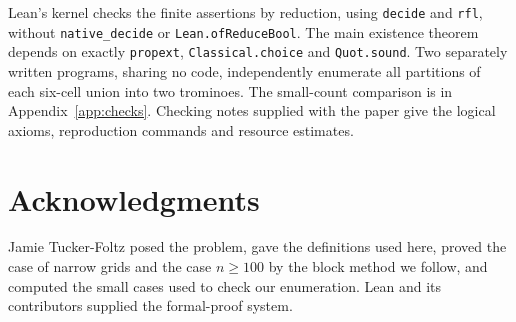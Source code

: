 \documentclass[11pt]{article}
\theoremstyle{definition}
\theoremstyle{remark}
\begin{document}
Lean's kernel checks the finite assertions by reduction, using
\texttt{decide} and \texttt{rfl}, without \texttt{native\_decide} or
\texttt{Lean.ofReduceBool}. The main existence theorem depends on exactly
\texttt{propext}, \texttt{Classical.choice} and \texttt{Quot.sound}. Two separately
written programs, sharing no code, independently enumerate all partitions
of each six-cell union into two trominoes. The small-count comparison is
in Appendix~\ref{app:checks}. Checking notes supplied with the paper give
the logical axioms, reproduction commands and resource estimates.

\section*{Acknowledgments}
Jamie Tucker-Foltz posed the problem, gave the definitions used here, proved
the case of narrow grids and the case $n\ge100$ by the block method we
follow, and computed the small cases used to check our enumeration. Lean and its
contributors supplied the formal-proof system.
\end{document}
